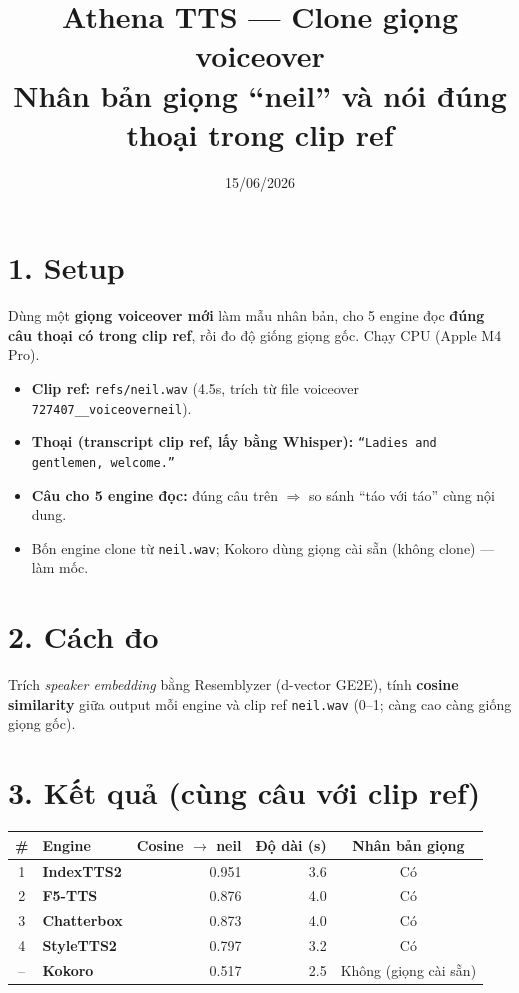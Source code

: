 \documentclass[11pt]{article}
\title{\textbf{Athena TTS — Clone giọng voiceover}\\[2pt]
\large Nhân bản giọng ``neil'' và nói đúng thoại trong clip ref}
\author{}
\date{15/06/2026}
\begin{document}
\maketitle
\vspace{-1.5em}

\section*{1. Setup}
Dùng một \textbf{giọng voiceover mới} làm mẫu nhân bản, cho 5 engine đọc \textbf{đúng câu
thoại có trong clip ref}, rồi đo độ giống giọng gốc. Chạy CPU (Apple M4 Pro).
\begin{itemize}\setlength\itemsep{1pt}
\item \textbf{Clip ref:} \texttt{refs/neil.wav} (4.5s, trích từ file voiceover \texttt{727407\_\_voiceoverneil}).
\item \textbf{Thoại (transcript clip ref, lấy bằng Whisper):} \texttt{``Ladies and gentlemen, welcome.''}
\item \textbf{Câu cho 5 engine đọc:} đúng câu trên $\Rightarrow$ so sánh ``táo với táo'' cùng nội dung.
\item Bốn engine clone từ \texttt{neil.wav}; Kokoro dùng giọng cài sẵn (không clone) — làm mốc.
\end{itemize}

\section*{2. Cách đo}
Trích \textit{speaker embedding} bằng Resemblyzer (d-vector GE2E), tính \textbf{cosine similarity}
giữa output mỗi engine và clip ref \texttt{neil.wav} (0--1; càng cao càng giống giọng gốc).

\section*{3. Kết quả (cùng câu với clip ref)}
\begin{table}[H]\centering
\begin{tabular}{c >{\bfseries}l r r c}
\toprule
\# & Engine & Cosine $\rightarrow$ neil & Độ dài (s) & Nhân bản giọng \\
\midrule
1 & IndexTTS2  & 0.951 & 3.6 & Có \\
2 & F5-TTS     & 0.876 & 4.0 & Có \\
3 & Chatterbox & 0.873 & 4.0 & Có \\
4 & StyleTTS2  & 0.797 & 3.2 & Có \\
\midrule
-- & Kokoro    & 0.517 & 2.5 & Không (giọng cài sẵn) \\
\bottomrule
\end{tabular}
\end{table}
\end{document}
